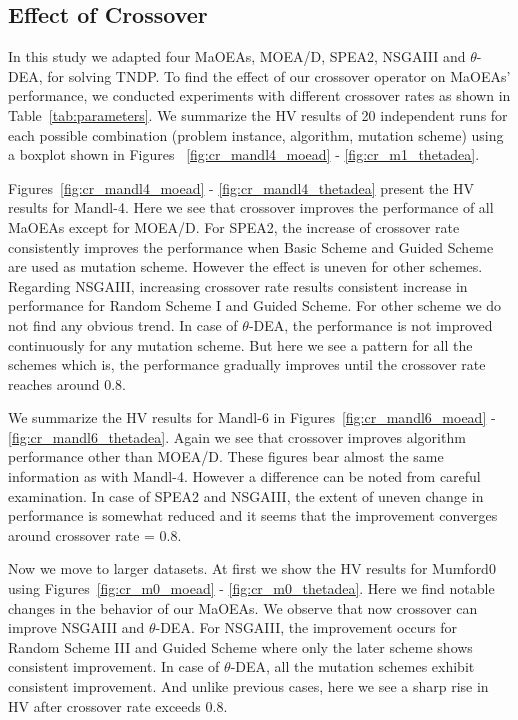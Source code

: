 \subsection{Effect of Crossover}

In this study we adapted four MaOEAs, MOEA/D, SPEA2, NSGAIII and $\theta$-DEA, for solving TNDP. To find the effect of our crossover operator on MaOEAs' performance, we conducted experiments with different crossover rates as shown in Table~\ref{tab:parameters}. We summarize the HV results of 20 independent runs for each possible combination (problem instance, algorithm, mutation scheme) using a boxplot shown in Figures ~\ref{fig:cr_mandl4_moead} - \ref{fig:cr_m1_thetadea}. 

Figures~\ref{fig:cr_mandl4_moead} - \ref{fig:cr_mandl4_thetadea} present the HV results for Mandl-4. Here we see that crossover improves the performance of all MaOEAs except for MOEA/D. For SPEA2, the increase of crossover rate consistently improves the performance when Basic Scheme and Guided Scheme are used as mutation scheme. However the effect is uneven for other schemes. Regarding NSGAIII, increasing crossover rate results consistent increase in performance for Random Scheme I and Guided Scheme. For other scheme we do not find any obvious trend. In case of $\theta$-DEA, the performance is not improved continuously for any mutation scheme. But here we see a pattern for all the schemes which is, the performance gradually improves until the crossover rate reaches around 0.8.

We summarize the  HV results for Mandl-6 in Figures~\ref{fig:cr_mandl6_moead} - \ref{fig:cr_mandl6_thetadea}. Again we see that crossover improves algorithm performance other than MOEA/D. These figures bear almost the same information as with Mandl-4. However a difference can be noted from careful examination. In case of SPEA2 and NSGAIII, the extent of uneven change in performance is somewhat reduced and it seems that the improvement converges around crossover rate = 0.8.   

Now we move to larger datasets. At first we show the HV results for Mumford0 using Figures~\ref{fig:cr_m0_moead} - \ref{fig:cr_m0_thetadea}. Here we find notable changes in the  behavior of our MaOEAs. We observe that now crossover can improve NSGAIII and $\theta$-DEA. For NSGAIII, the improvement occurs for Random Scheme III and Guided Scheme where only the later scheme shows consistent improvement.  In case of $\theta$-DEA, all the mutation schemes exhibit consistent improvement. And unlike previous cases, here we see a sharp rise in HV after crossover rate exceeds 0.8.

